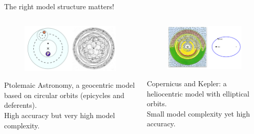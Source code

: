 \documentclass[aspectratio=169]{../latex_main/tntbeamer}  %
\begin{document}
	\begin{frame}{The right model structure matters!}
	    \begin{columns}
	        \begin{column}{.5\textwidth}
	                \begin{figure}
	                    \includegraphics[scale=.35]{Bild15}
	                \end{figure}
	                Ptolemaic Astronomy, a geocentric model based on circular orbits (epicycles and deferents).\\
	                \bigskip
	                High accuracy but very high model complexity.
	        \end{column}
	        
	        
	        \begin{column}{.5\textwidth}
	                \begin{figure}
	                    \includegraphics[scale=.35]{Bild16}
	                \end{figure}
	                Copernicus and Kepler: a heliocentric model with elliptical orbits.\\
	                \bigskip
	                Small model complexity yet high accuracy.

	        \end{column}
	    \end{columns}
	\end{frame}
	
\end{document}
